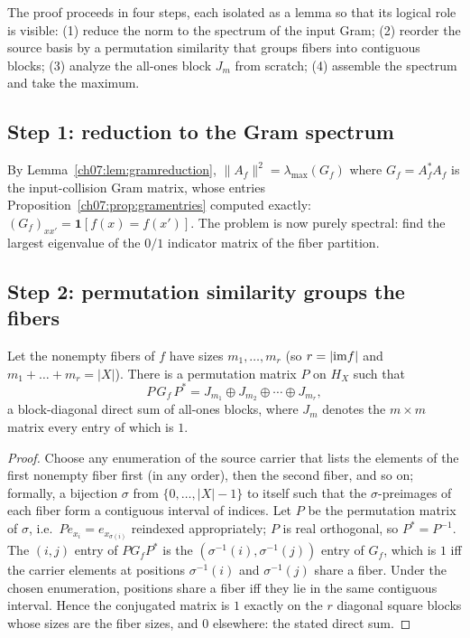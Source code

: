 The proof proceeds in four steps, each isolated as a lemma so that its
logical role is visible: (1) reduce the norm to the spectrum of the input
Gram; (2) reorder the source basis by a permutation similarity that groups
fibers into contiguous blocks; (3) analyze the all-ones block $J_m$ from
scratch; (4) assemble the spectrum and take the maximum.

\subsection{Step 1: reduction to the Gram spectrum}

By Lemma~\ref{ch07:lem:gramreduction},
$\lVert A_f\rVert^2=\lambda_{\max}(G_f)$ where $G_f=A_f^*A_f$ is the
input-collision Gram matrix, whose entries
Proposition~\ref{ch07:prop:gramentries} computed exactly:
$(G_f)_{xx'}=\mathbf{1}[f(x)=f(x')]$. The problem is now purely spectral:
find the largest eigenvalue of the $0/1$ indicator matrix of the fiber
partition.

\subsection{Step 2: permutation similarity groups the fibers}

\begin{lemma}\label{ch07:lem:fiberblock}
Let the nonempty fibers of $f$ have sizes $m_1,\dots,m_r$ (so
$r=|\mathrm{im} f|$ and $m_1+\dots+m_r=|X|$). There is a permutation matrix $P$ on
$H_X$ such that
\[
P\,G_f\,P^{*}=J_{m_1}\oplus J_{m_2}\oplus\cdots\oplus J_{m_r},
\]
a block-diagonal direct sum of all-ones blocks, where $J_m$ denotes the
$m\times m$ matrix every entry of which is $1$.
\end{lemma}

\begin{proof}
Choose any enumeration of the source carrier that lists the elements of the
first nonempty fiber first (in any order), then the second fiber, and so on;
formally, a bijection $\sigma$ from $\{0,\dots,|X|-1\}$ to itself such that
the $\sigma$-preimages of each fiber form a contiguous interval of indices.
Let $P$ be the permutation matrix of $\sigma$, i.e.\ $Pe_{x_i}=e_{x_{\sigma(i)}}$
reindexed appropriately; $P$ is real orthogonal, so $P^{*}=P^{-1}$. The
$(i,j)$ entry of $P G_f P^{*}$ is the $(\sigma^{-1}(i),\sigma^{-1}(j))$ entry
of $G_f$, which is $1$ iff the carrier elements at positions
$\sigma^{-1}(i)$ and $\sigma^{-1}(j)$ share a fiber. Under the chosen
enumeration, positions share a fiber iff they lie in the same contiguous
interval. Hence the conjugated matrix is $1$ exactly on the $r$ diagonal
square blocks whose sizes are the fiber sizes, and $0$ elsewhere: the stated
direct sum.
\end{proof}


